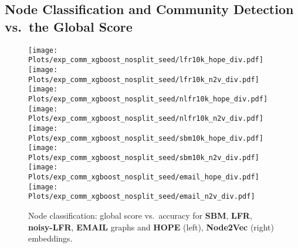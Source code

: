 %
%
%
%

\clearpage

\subsection{Node Classification and Community Detection vs.\ the Global Score}

\begin{figure}[ht]
    \centering
    \texttt{[image: Plots/exp\_comm\_xgboost\_nosplit\_seed/lfr10k\_hope\_div.pdf]}
        \hspace{.1cm}
    \texttt{[image: Plots/exp\_comm\_xgboost\_nosplit\_seed/lfr10k\_n2v\_div.pdf]}
    \vspace{.1cm}
    \texttt{[image: Plots/exp\_comm\_xgboost\_nosplit\_seed/nlfr10k\_hope\_div.pdf]}
        \hspace{.1cm}
    \texttt{[image: Plots/exp\_comm\_xgboost\_nosplit\_seed/nlfr10k\_n2v\_div.pdf]}
    \vspace{.1cm}
    \texttt{[image: Plots/exp\_comm\_xgboost\_nosplit\_seed/sbm10k\_hope\_div.pdf]}
        \hspace{.1cm}
    \texttt{[image: Plots/exp\_comm\_xgboost\_nosplit\_seed/sbm10k\_n2v\_div.pdf]}
        \hspace{.1cm}
    \texttt{[image: Plots/exp\_comm\_xgboost\_nosplit\_seed/email\_hope\_div.pdf]}
        \hspace{.1cm}
    \texttt{[image: Plots/exp\_comm\_xgboost\_nosplit\_seed/email\_n2v\_div.pdf]}
    \caption{Node classification: global score vs.\ accuracy for \textbf{SBM}, \textbf{LFR}, \textbf{noisy-LFR}, \textbf{EMAIL} graphs and \textbf{HOPE} (left), \textbf{Node2Vec} (right) embeddings.}
    \label{fig:10kxgboost}
\end{figure}

